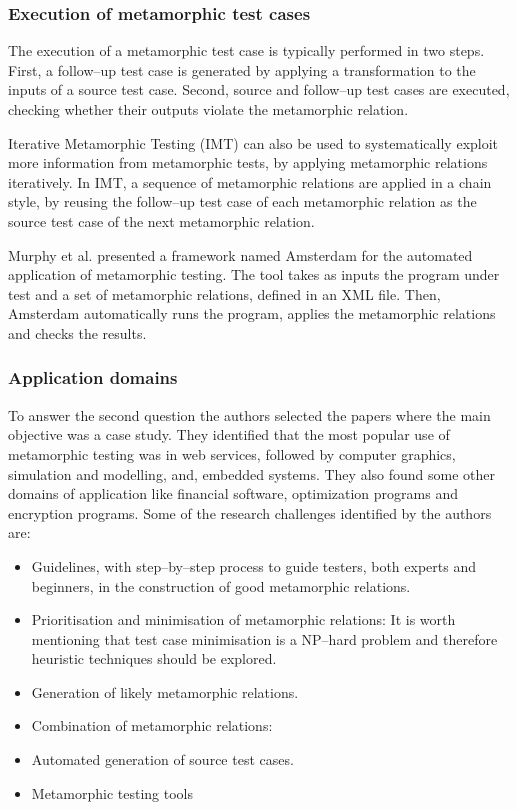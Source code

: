		\subsubsection{Execution of metamorphic test cases}
		The execution of a metamorphic test case is typically performed in two steps. First, a follow–up test case is generated by applying a transformation to the inputs of a source test case. Second, source and follow–up test cases are executed, checking whether their outputs violate the metamorphic relation. \par
		Iterative Metamorphic Testing (IMT) can also be used to systematically exploit more information from metamorphic tests, by applying metamorphic relations iteratively. In IMT, a sequence of metamorphic relations are applied in a chain style, by reusing the follow–up test case of each metamorphic relation as the source test case of the next metamorphic relation. \par
		Murphy et al. \cite{} presented a framework named Amsterdam for the automated application of metamorphic testing. The tool takes as inputs the program under test and a set of metamorphic relations, defined in an XML file. Then, Amsterdam automatically runs the program, applies the metamorphic relations and checks the results.
		\subsubsection{Application domains}
		To answer the second question the authors selected the papers where the main objective was a case study. They identified that the most popular use of metamorphic testing was in web services, followed by computer graphics, simulation and modelling, and, embedded systems. They also found some other domains of application like financial software, optimization programs and encryption programs.
		Some of the research challenges identified by the authors are:
		\begin{itemize}
			\item Guidelines, with step–by–step process to guide testers, both experts and beginners, in the construction of good metamorphic relations.
			\item Prioritisation and minimisation of metamorphic relations: It is worth mentioning that test case minimisation is a NP–hard problem and therefore heuristic techniques should be explored.
			\item Generation of likely metamorphic relations.
			\item Combination of metamorphic relations:
			\item Automated generation of source test cases.
			\item Metamorphic testing tools
		\end{itemize}



